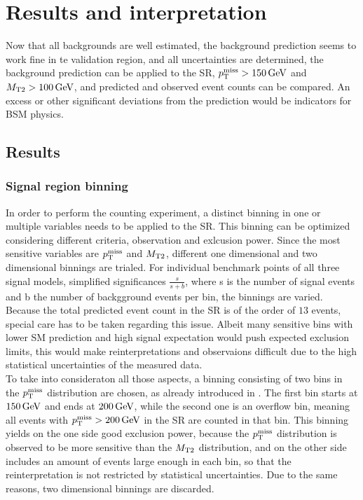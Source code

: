 \chapter{Results and interpretation}\label{chap:results}
Now that all backgrounds are well estimated, the background prediction seems to work fine in te validation region, and all uncertainties are determined, the background prediction can be applied to the SR, $p_{\mathrm{T}}^\text{miss}>150\,\text{Ge\hspace{-.08em}V}$ and $M_{\mathrm{T2}}>100\,\text{Ge\hspace{-.08em}V}$, and predicted and observed event counts can be compared. An excess or other significant deviations from the prediction would be indicators for BSM physics.
\section{Results}\label{sec:results}
\subsection*{Signal region binning}
In order to perform the counting experiment, a distinct binning in one or multiple variables needs to be applied to the SR. This binning can be optimized considering different criteria, \eg observation and exlcusion power. Since the most sensitive variables are $p_{\mathrm{T}}^\text{miss}$ and $M_{\mathrm{T2}}$, different one dimensional and two dimensional binnings are trialed. For individual benchmark points of all three signal models, simplified significances $\frac{s}{s+b}$, where s is the number of signal events and b the number of backgground events per bin, the binnings are varied. Because the total predicted event count in the SR is of the order of $13$ events, special care has to be taken regarding this issue. Albeit many sensitive bins with lower SM prediction and high signal expectation would push expected exclusion limits, this would make reinterpretations and observaions difficult due to the high statistical uncertainties of the measured data.\\
To take into consideraton all those aspects, a binning consisting of two bins in the $p_{\mathrm{T}}^\text{miss}$ distribution are chosen, as already introduced in . The first bin starts at $150\,\text{Ge\hspace{-.08em}V}$ and ends at $200\,\text{Ge\hspace{-.08em}V}$, while the second one is an overflow bin, meaning all events with $p_{\mathrm{T}}^\text{miss}>200\,\text{Ge\hspace{-.08em}V}$ in the SR are counted in that bin. This binning yields on the one side good exclusion power, because the $p_{\mathrm{T}}^\text{miss}$ distribution is observed to be more sensitive than the $M_{\mathrm{T2}}$ distribution, and on the other side includes an amount of events large enough in each bin, so that the reinterpretation is not restricted by statistical uncertainties. Due to the same reasons, two dimensional binnings are discarded.
